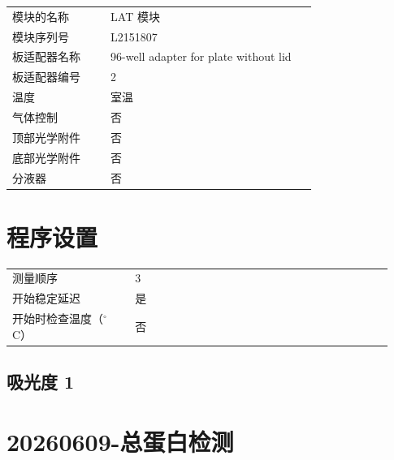 \documentclass[UTF8,10pt,a4paper,fontset=fandol]{ctexart}
\newcommand{\fieldvalue}[1]{#1}
\begin{document}
\begin{tabular}{@{}p{0.30\linewidth}p{0.63\linewidth}@{}}
模块的名称 &
\fieldvalue{LAT 模块}\\
模块序列号 &
\fieldvalue{L2151807}\\
板适配器名称 &
\fieldvalue{96-well adapter for plate without lid}\\
板适配器编号 &
\fieldvalue{2}\\
温度 &
\fieldvalue{室温}\\
气体控制 &
\fieldvalue{否}\\
顶部光学附件 &
\fieldvalue{否}\\
底部光学附件 &
\fieldvalue{否}\\
分液器 &
\fieldvalue{否}
\end{tabular}

\section*{程序设置}

\begin{tabular}{@{}p{0.30\linewidth}p{0.63\linewidth}@{}}
测量顺序 &
\fieldvalue{3}\\
开始稳定延迟 &
\fieldvalue{是}\\
开始时检查温度（$^\circ$C） &
\fieldvalue{否}
\end{tabular}

\subsection*{吸光度 1}


\newpage

\section*{20260609-总蛋白检测}
\end{document}
